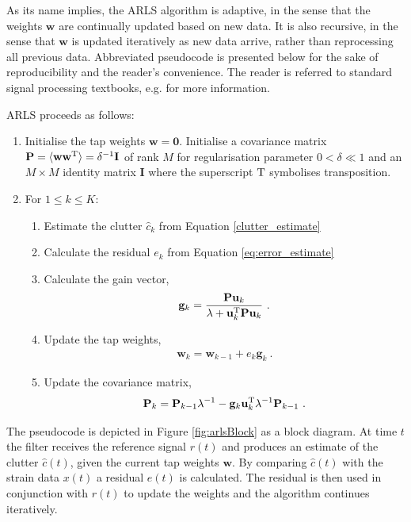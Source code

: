 \documentclass[pra,superscriptaddress,reprint,amsmath,amssymb,nofootinbib]{revtex4-2}
\begin{document}
As its name implies, the ARLS algorithm is adaptive, in the sense that the weights $\mathbf{w}$ are continually updated based on new data. It is also recursive, in the sense that $\mathbf{w}$ is updated iteratively as new data arrive, rather than reprocessing all previous data. Abbreviated pseudocode is presented below for the sake of reproducibility and the reader's convenience. The reader is referred to standard signal processing textbooks, e.g. \cite{HaykinAdaptiveFT:2002} for more information. \newline 

ARLS proceeds as follows:

\begin{enumerate}
	\item Initialise the tap weights $\mathbf{w} = \mathbf{0}$. Initialise a covariance matrix ${\bf P} = \langle {\bf w} {\bf w}^{\rm T} \rangle = \delta^{-1} {\bf I}$ of rank $M$ for regularisation parameter $0 < \delta \ll 1$  and an $M \times M$ identity matrix $\mathbf{I}$ where the superscript $\rm T$ symbolises transposition.
	\item For $1 \leq k \leq K$:
	\begin{enumerate}
		\item Estimate the clutter $\hat{c}_k$ from Equation \eqref{clutter_estimate}
		\item Calculate the residual $e_k$ from Equation \eqref{eq:error_estimate}
		\item Calculate the gain vector,
		\begin{eqnarray}
			\mathbf{g}_k = \frac{\mathbf{P} \mathbf{u}_k}{\lambda + \mathbf{u}_k^{\rm T}\mathbf{P} \mathbf{u}_k} \ .
		\end{eqnarray}
	\item Update the tap weights,
			\begin{eqnarray}
		\mathbf{w}_k = \mathbf{w}_{k-1} +  e_k \mathbf{g}_k  \ .
	\end{eqnarray}
	\item Update the covariance matrix,
\begin{eqnarray}
	\mathbf{P}_k =  \mathbf{P}_{k-1}  \lambda^{-1}  - \mathbf{g}_k \mathbf{u}_k^{\rm T}  \lambda^{-1} \mathbf{P}_{k-1} \ .
\end{eqnarray}

	\end{enumerate}

\end{enumerate}
The pseudocode is depicted in Figure \ref{fig:arlsBlock} as a block diagram. At time $t$ the filter receives the reference signal $r(t)$ and produces an estimate of the clutter $\hat{c}(t)$, given the current tap weights $\mathbf{w}$. By comparing $\hat{c}(t)$ with the strain data $x(t)$ a residual $e(t)$ is calculated. The residual is then used in conjunction with $r(t)$ to update the weights and the algorithm continues iteratively. \newline 
\end{document}
